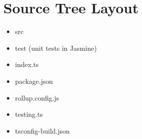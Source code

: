 \section{Source Tree Layout}


\begin{itemize}
  \item src
  \item test (unit tests in Jasmine)
\end{itemize}


\begin{itemize}
  \item index.ts
  \item package.json
  \item rollup.config.js
  \item testing.ts
  \item tsconfig-build.json
\end{itemize}
